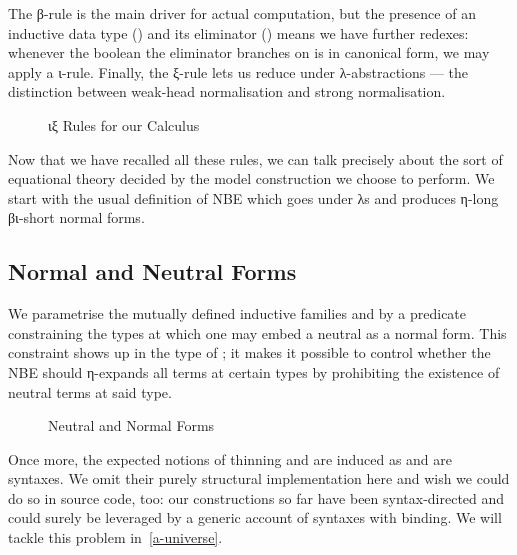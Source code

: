 The β-rule is the main driver for actual computation,
but the presence of an inductive data type () and its eliminator
() means we have further redexes: whenever the
boolean the eliminator branches on is in canonical form, we may apply
a ι-rule. Finally, the ξ-rule lets us reduce under
λ-abstractions --- the distinction between weak-head normalisation and
strong normalisation.

\begin{figure}[h]
\caption{ιξ Rules for our Calculus\label{fig:iotaxirules}}
\end{figure}

Now that we have recalled all these rules, we can talk precisely about the
sort of equational theory decided by the model construction we choose to
perform. We start with the usual definition of NBE
which goes under λs and produces η-long βι-short normal forms.

\subsection{Normal and Neutral Forms}

We parametrise the mutually defined inductive families  and 
by a predicate  constraining the types at which one may embed a neutral
as a normal form. This constraint shows up in the type of ; it makes
it possible to control whether the NBE should η-expands all terms at certain
types by prohibiting the existence of neutral terms at said type.

\begin{figure}[h]
\caption{Neutral and Normal Forms}
\end{figure}

Once more, the expected notions of thinning  and
 are induced as  and  are syntaxes.
We omit their purely
structural implementation here and wish we could do so in source code,
too: our constructions so far have been syntax-directed and could
surely be leveraged by a generic account of syntaxes with binding.
We will tackle this problem in~\cref{a-universe}.

